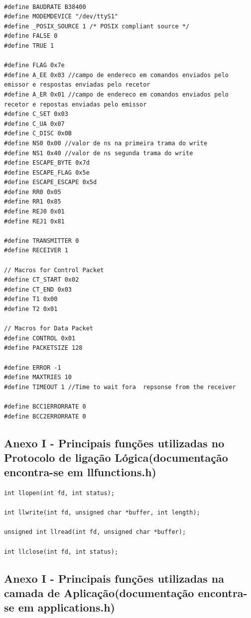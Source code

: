 \documentclass[11pt]{article}
\begin{document}
\begin{lstlisting}[style=CStyle]

#define BAUDRATE B38400
#define MODEMDEVICE "/dev/ttyS1"
#define _POSIX_SOURCE 1 /* POSIX compliant source */
#define FALSE 0
#define TRUE 1

#define FLAG 0x7e
#define A_EE 0x03 //campo de endereco em comandos enviados pelo emissor e respostas enviadas pelo recetor
#define A_ER 0x01 //campo de endereco em comandos enviados pelo recetor e repostas enviadas pelo emissor
#define C_SET 0x03
#define C_UA 0x07
#define C_DISC 0x0B
#define NS0 0x00 //valor de ns na primeira trama do write
#define NS1 0x40 //valor de ns segunda trama do write
#define ESCAPE_BYTE 0x7d 
#define ESCAPE_FLAG 0x5e
#define ESCAPE_ESCAPE 0x5d
#define RR0 0x05
#define RR1 0x85
#define REJ0 0x01
#define REJ1 0x81

#define TRANSMITTER 0 
#define RECEIVER 1

// Macros for Control Packet
#define CT_START 0x02
#define CT_END 0x03
#define T1 0x00
#define T2 0x01

// Macros for Data Packet
#define CONTROL 0x01
#define PACKETSIZE 128

#define ERROR -1
#define MAXTRIES 10
#define TIMEOUT 1 //Time to wait fora  repsonse from the receiver

#define BCC1ERRORRATE 0
#define BCC2ERRORRATE 0
\end{lstlisting}

\subsection{Anexo I - Principais funções utilizadas no Protocolo de ligação Lógica(documentação encontra-se em llfunctions.h)}

\begin{lstlisting}[style=CStyle]
int llopen(int fd, int status);

int llwrite(int fd, unsigned char *buffer, int length);

unsigned int llread(int fd, unsigned char *buffer);

int llclose(int fd, int status);
\end{lstlisting}

\pagebreak

\subsection{Anexo I - Principais funções utilizadas na camada de Aplicação(documentação encontra-se em applications.h)}
\end{document}
